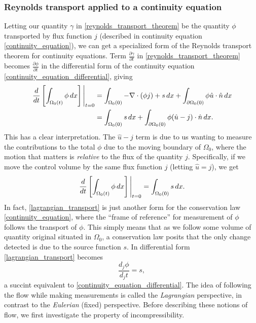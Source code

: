 \documentclass[11pt,a4paper]{memoir}
\newcommand{\Part}[2]{\frac{\partial #1}{\partial #2}}
\begin{document}
\subsubsection{Reynolds transport applied to a continuity equation}
Letting our quantity $\gamma$ in \eqref{reynolds_transport_theorem} be the quantity $\phi$ transported by flux function $j$
(described in continuity equation \eqref{continuity_equation}), we can get a specialized form of the Reynolds transport theorem for continuity equations.
Term $\Part{\gamma}{t}$ in \eqref{reynolds_transport_theorem} becomes $\Part{\phi}{t}$ in the differential form of the continuity equation \eqref{continuity_equation_differential}, giving
\begin{equation}\label{reynolds_transport_continuity_equation}
\begin{split}
    \eval{\frac{d}{dt}\left[\int_{\Omega_0(t)}\phi\,dx\right]}_{t=0}
        &= \int_{\Omega_0(0)}-\nabla\cdot(\phi j) + s\,dx + \int_{\partial\Omega_0(0)}\phi \hat{u}\cdot\hat{n} \,dx \\
        &= \int_{\Omega_0(0)}s\,dx + \int_{\partial\Omega_0(0)}\phi (\hat{u} - j)\cdot\hat{n} \,dx.
\end{split}
\end{equation}
This has a clear interpretation. The $\hat{u} - j$ term is due to us wanting to measure the contributions to the total $\phi$ due to the moving boundary of
$\Omega_0$, where the motion that matters is \textit{relative} to the flux of the quantity $j$. Specifically, if we move the control volume by
the same flux function $j$ (letting $\hat{u} = j$), we get
\begin{equation}\label{lagrangian_transport}
    \eval{\frac{d}{dt}\left[\int_{\Omega_0(t)}\phi\,dx\right]}_{t=0}
        = \int_{\Omega_0(0)}s\,dx.
\end{equation}
In fact, \eqref{lagrangian_transport} is just another form for the conservation law \eqref{continuity_equation},
where the ``frame of reference'' for measurement of $\phi$ follows the transport of $\phi$. This simply means that as we follow some volume of quantity
original situated in $\Omega_0$, a conservation law posits that the only change detected is due to the source function $s$. In differential form
\eqref{lagrangian_transport} becomes
\begin{equation}\label{lagrangian_transport_differential}
    \frac{d_j\phi}{d_j t} = s,
\end{equation}
a succint equivalent to \eqref{continuity_equation_differential}.
The idea of following the flow while making measurements is called the \textit{Lagrangian} perspective, in contrast to the \textit{Eulerian} (fixed) perspective.
Before describing these notions of flow, we first investigate the property of incompressibility.
\end{document}
